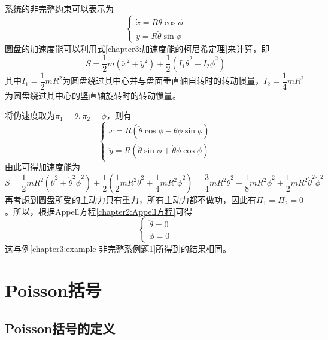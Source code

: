 \begin{example}
系统的非完整约束可以表示为
\begin{equation*}
\begin{cases}
	\dot{x} = R\dot{\theta}\cos\phi \\
	\dot{y} = R\dot{\theta}\sin\phi
\end{cases}
\end{equation*}
圆盘的加速度能可以利用式\eqref{chapter3:加速度能的柯尼希定理}来计算，即
\begin{equation*}
	S = \frac12 m(\ddot{x}^2+\ddot{y}^2) + \frac12 (I_1\ddot{\theta}^2 + I_2\ddot{\phi}^2)
\end{equation*}
其中$I_1=\dfrac12 mR^2$为圆盘绕过其中心并与盘面垂直轴自转时的转动惯量，$I_2=\dfrac14mR^2$为圆盘绕过其中心的竖直轴旋转时的转动惯量。

将伪速度取为$\dot{\pi}_1 = \dot{\theta}, \dot{\pi}_2 = \dot{\phi}$，则有
\begin{equation*}
\begin{cases}
	\ddot{x} = R(\ddot{\theta}\cos\phi - \dot{\theta}\dot{\phi}\sin\phi) \\
	\ddot{y} = R(\ddot{\theta}\sin\phi + \dot{\theta}\dot{\phi}\cos\phi)
\end{cases}
\end{equation*}
由此可得加速度能为
\begin{equation*}
	S = \frac12 mR^2(\ddot{\theta}^2 + \dot{\theta}^2\dot{\phi}^2) + \frac12 \left(\frac12 mR^2\ddot{\theta}^2 + \dfrac14mR^2\ddot{\phi}^2\right) = \frac34mR^2\ddot{\theta}^2 + \frac18mR^2\ddot{\phi}^2 + \frac12 mR^2 \dot{\theta}^2\dot{\phi}^2
\end{equation*}
再考虑到圆盘所受的主动力只有重力，所有主动力都不做功，因此有$\varPi_1=\varPi_2=0$。所以，根据Appell方程\eqref{chapter2:Appell方程}可得
\begin{equation*}
\begin{cases}
	\ddot{\theta} = 0 \\
	\ddot{\phi} = 0
\end{cases}
\end{equation*}
这与例\ref{chapter3:example-非完整系例题1}所得到的结果相同。
\end{example}

\section{Poisson括号}

\subsection{Poisson括号的定义}

